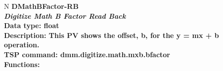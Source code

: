 \documentclass[openany]{article}
\begin{document}
		\begin{tabular}{N}
			\hline
			\bfseries DMathBFactor-RB\label{pv:dmathbfactor-rb} \\ \hline
			\emph{Digitize Math B Factor Read Back} \\
			Data type: float \\
			Description: This PV shows the offset, b, for the y = mx + b operation. \\
			TSP command: dmm.digitize.math.mxb.bfactor \\
			Functions: \\
			\arrayrulecolor{\FuncTableBorderColor}

		\end{tabular}
\end{document}
